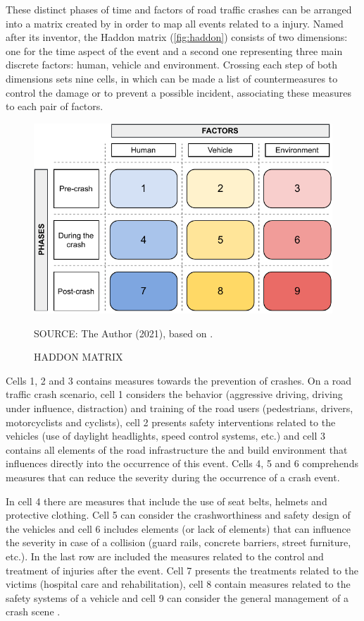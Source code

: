 These distinct phases of time and factors of road traffic crashes can be arranged into a matrix created by \textcite{Haddon1980} in order to map all events related to a injury. Named after its inventor, the Haddon matrix (\autoref{fig:haddon}) consists of two dimensions: one for the time aspect of the event and a second one representing three main discrete factors: human, vehicle and environment. Crossing each step of both dimensions sets nine cells, in which can be made a list of countermeasures to control the damage or to prevent a possible incident, associating these measures to each pair of factors. 

\begin{figure}[!htbp]
    \centering\footnotesize
    \captionsetup{font=footnotesize}
    \caption{HADDON MATRIX}
    \includegraphics{fig/haddon.pdf}
    \label{fig:haddon}
    \par SOURCE: The Author (2021), based on \textcite{Haddon1980}.
\end{figure} 

Cells 1, 2 and 3 contains measures towards the prevention of crashes. On a road traffic crash scenario, cell 1 considers the behavior (aggressive driving, driving under influence, distraction) and training of the road users (pedestrians, drivers, motorcyclists and cyclists), cell 2 presents safety interventions related to the vehicles (use of daylight headlights, speed control systems, etc.) and cell 3 contains all elements of the road infrastructure the and build environment that influences directly into the occurrence of this event. Cells 4, 5 and 6 comprehends measures that can reduce the severity during the occurrence of a crash event.

In cell 4 there are measures that include the use of seat belts, helmets and protective clothing. Cell 5 can consider the crashworthiness and safety design of the vehicles and cell 6 includes elements (or lack of elements) that can influence the severity in case of a collision (guard rails, concrete barriers, street furniture, etc.). In the last row are included the measures related to the control and treatment of injuries after the event. Cell 7 presents the treatments related to the victims (hospital care and rehabilitation), cell 8 contain measures related to the safety systems of a vehicle and cell 9 can consider the general management of a crash scene \cite{Mohan2016}. 

